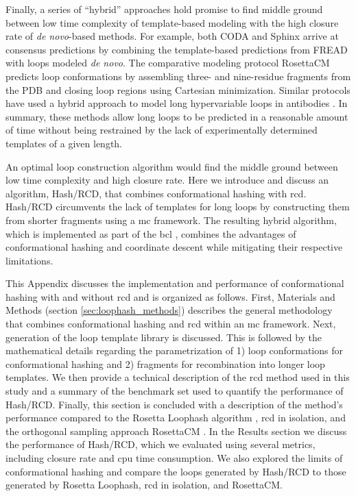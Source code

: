 Finally, a series of “hybrid” approaches hold promise to find middle ground between low time complexity of template-based modeling with the high closure rate of \emph{de novo}-based methods. For example, both CODA \citep*{Deane2001} and Sphinx \citep*{Marks2017} arrive at consensus predictions by combining the template-based predictions from FREAD \citep*{Choi2010} with loops modeled \emph{de novo}. The comparative modeling protocol RosettaCM \citep*{Song2013} predicts loop conformations by assembling three- and nine-residue fragments from the PDB and closing loop regions using Cartesian minimization. Similar protocols have used a hybrid approach to model long hypervariable loops in antibodies \citep*{Fasnacht2014, Martin1989, Mas1992, Whitelegg2000}. In summary, these methods allow long loops to be predicted in a reasonable amount of time without being restrained by the lack of experimentally determined templates of a given length.

An optimal loop construction algorithm would find the middle ground between low time complexity and high closure rate. Here we introduce and discuss an algorithm, Hash/RCD, that combines conformational hashing with \gls{rcd}. Hash/RCD circumvents the lack of templates for long loops by constructing them from shorter fragments using a \gls{mc} framework. The resulting hybrid algorithm, which is implemented as part of the \gls{bcl} \citep*{Karakas2012, Woetzel2012}, combines the advantages of conformational hashing and coordinate descent while mitigating their respective limitations. 

This Appendix discusses the implementation and performance of conformational hashing with and without \gls{rcd} and is organized as follows. First, Materials and Methods (section \ref{sec:loophash_methods}) describes the general methodology that combines conformational hashing and \gls{rcd} within an \gls{mc} framework. Next, generation of the loop template library is discussed. This is followed by the mathematical details regarding the parametrization of 1) loop conformations for conformational hashing and 2) fragments for recombination into longer loop templates. We then provide a technical description of the \gls{rcd} method used in this study and a summary of the benchmark set used to quantify the performance of Hash/RCD. Finally, this section is concluded with a description of the method's performance compared to the Rosetta Loophash algorithm \citep*{Tyka2012}, \gls{rcd} in isolation, and the orthogonal sampling approach RosettaCM \citep*{Song2013}. In the Results section we discuss the performance of Hash/RCD, which we evaluated using several metrics, including closure rate and \gls{cpu} time consumption. We also explored the limits of conformational hashing and compare the loops generated by Hash/RCD to those generated by Rosetta Loophash, \gls{rcd} in isolation, and RosettaCM.

